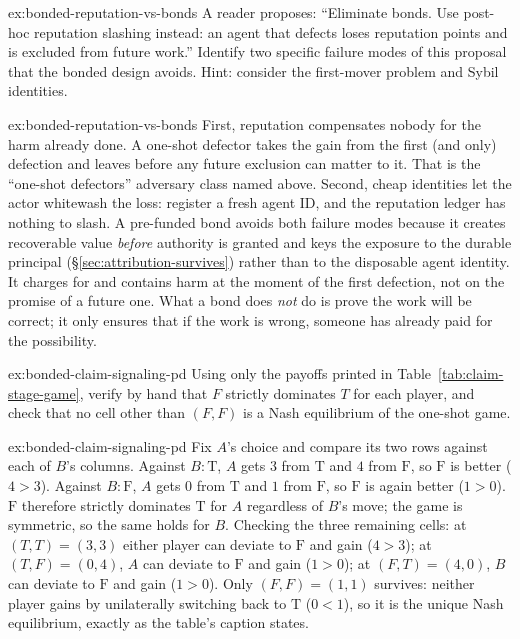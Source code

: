 \documentclass[11pt,a4paper]{article}
\theoremstyle{definition}
\theoremstyle{remark}
\begin{document}
\begin{pdexercise}[kind=Check,rating=1]{ex:bonded-reputation-vs-bonds}
A reader proposes: ``Eliminate bonds. Use post-hoc reputation slashing instead: an agent that defects loses reputation points and is excluded from future work.'' Identify two specific failure modes of this proposal that the bonded design avoids. Hint: consider the first-mover problem and Sybil identities.
\end{pdexercise}
\begin{pdsolution}{ex:bonded-reputation-vs-bonds}
First, reputation compensates nobody for the harm already done. A one-shot defector takes the gain from the first (and only) defection and leaves before any future exclusion can matter to it. That is the ``one-shot defectors'' adversary class named above. Second, cheap identities let the actor whitewash the loss: register a fresh agent ID, and the reputation ledger has nothing to slash. A pre-funded bond avoids both failure modes because it creates recoverable value \emph{before} authority is granted and keys the exposure to the durable principal (\S\ref{sec:attribution-survives}) rather than to the disposable agent identity. It charges for and contains harm at the moment of the first defection, not on the promise of a future one. What a bond does \emph{not} do is prove the work will be correct; it only ensures that if the work is wrong, someone has already paid for the possibility.
\end{pdsolution}


\begin{pdexercise}[kind=Check,rating=1]{ex:bonded-claim-signaling-pd}
Using only the payoffs printed in Table~\ref{tab:claim-stage-game}, verify by hand that $F$ strictly dominates $T$ for each player, and check that no cell other than $(F,F)$ is a Nash equilibrium of the one-shot game.
\end{pdexercise}
\begin{pdsolution}{ex:bonded-claim-signaling-pd}
Fix $A$'s choice and compare its two rows against each of $B$'s columns. Against $B{:}\mathrm{T}$, $A$ gets $3$ from $\mathrm{T}$ and $4$ from $\mathrm{F}$, so $\mathrm{F}$ is better ($4>3$). Against $B{:}\mathrm{F}$, $A$ gets $0$ from $\mathrm{T}$ and $1$ from $\mathrm{F}$, so $\mathrm{F}$ is again better ($1>0$). $\mathrm{F}$ therefore strictly dominates $\mathrm{T}$ for $A$ regardless of $B$'s move; the game is symmetric, so the same holds for $B$. Checking the three remaining cells: at $(T,T)=(3,3)$ either player can deviate to $\mathrm{F}$ and gain ($4>3$); at $(T,F)=(0,4)$, $A$ can deviate to $\mathrm{F}$ and gain ($1>0$); at $(F,T)=(4,0)$, $B$ can deviate to $\mathrm{F}$ and gain ($1>0$). Only $(F,F)=(1,1)$ survives: neither player gains by unilaterally switching back to $\mathrm{T}$ ($0<1$), so it is the unique Nash equilibrium, exactly as the table's caption states.


\end{pdsolution}
\end{document}
